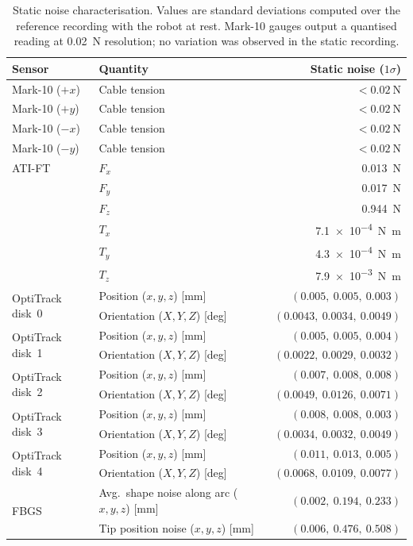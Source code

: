 \begin{table}[ht]
\centering
\caption{Static noise characterisation.
Values are standard deviations computed over the reference recording with the robot at rest.
Mark-10 gauges output a quantised reading at \SI{0.02}{\newton} resolution; no variation was observed in the static recording.}
\label{tab:sensor_noise}
\renewcommand{\arraystretch}{1.2}
\footnotesize
\begin{tabular}{@{} l l r @{}}
\toprule
\textbf{Sensor} & \textbf{Quantity} & \textbf{Static noise ($1\sigma$)} \\
\midrule
Mark-10 ($+x$) & Cable tension & $<\SI{0.02}{\newton}$ \\
Mark-10 ($+y$) & Cable tension & $<\SI{0.02}{\newton}$ \\
Mark-10 ($-x$) & Cable tension & $<\SI{0.02}{\newton}$ \\
Mark-10 ($-y$) & Cable tension & $<\SI{0.02}{\newton}$ \\
\midrule
ATI-FT & $F_x$ & \SI{0.013}{\newton} \\
       & $F_y$ & \SI{0.017}{\newton} \\
       & $F_z$ & \SI{0.944}{\newton} \\
       & $T_x$ & \SI{7.1e-4}{\newton\meter} \\
       & $T_y$ & \SI{4.3e-4}{\newton\meter} \\
       & $T_z$ & \SI{7.9e-3}{\newton\meter} \\
\midrule
\multirow{2}{*}{OptiTrack disk~0} & Position ($x,y,z$) [mm]    & $(0.005,\ 0.005,\ 0.003)$ \\
                                  & Orientation ($X,Y,Z$) [deg] & $(0.0043,\ 0.0034,\ 0.0049)$ \\
\multirow{2}{*}{OptiTrack disk~1} & Position ($x,y,z$) [mm]    & $(0.005,\ 0.005,\ 0.004)$ \\
                                  & Orientation ($X,Y,Z$) [deg] & $(0.0022,\ 0.0029,\ 0.0032)$ \\
\multirow{2}{*}{OptiTrack disk~2} & Position ($x,y,z$) [mm]    & $(0.007,\ 0.008,\ 0.008)$ \\
                                  & Orientation ($X,Y,Z$) [deg] & $(0.0049,\ 0.0126,\ 0.0071)$ \\
\multirow{2}{*}{OptiTrack disk~3} & Position ($x,y,z$) [mm]    & $(0.008,\ 0.008,\ 0.003)$ \\
                                  & Orientation ($X,Y,Z$) [deg] & $(0.0034,\ 0.0032,\ 0.0049)$ \\
\multirow{2}{*}{OptiTrack disk~4} & Position ($x,y,z$) [mm]    & $(0.011,\ 0.013,\ 0.005)$ \\
                                  & Orientation ($X,Y,Z$) [deg] & $(0.0068,\ 0.0109,\ 0.0077)$ \\
\midrule
\multirow{2}{*}{FBGS} & Avg.\ shape noise along arc ($x,y,z$) [mm] & $(0.002,\ 0.194,\ 0.233)$ \\
                      & Tip position noise ($x,y,z$) [mm]           & $(0.006,\ 0.476,\ 0.508)$ \\
\bottomrule
\end{tabular}
\end{table}
